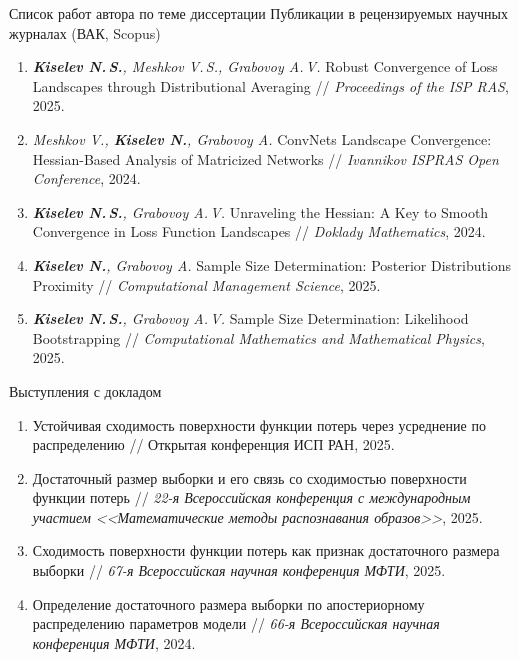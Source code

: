 \documentclass[aspectratio=169]{beamer}
\begin{document}
\begin{frame}{Список работ автора по теме диссертации}
    \scriptsize
    { Публикации в рецензируемых научных журналах (ВАК, Scopus)}\\
    \begin{enumerate}
        \item \textit{\textbf{Kiselev N.\,S.}, Meshkov V.\,S., Grabovoy A.\,V.} Robust Convergence of Loss Landscapes through Distributional Averaging // \textit{Proceedings of the ISP RAS}, 2025.
        \item \textit{Meshkov V., \textbf{Kiselev N.}, Grabovoy A.} ConvNets Landscape Convergence: Hessian-Based Analysis of Matricized Networks // \textit{Ivannikov ISPRAS Open Conference}, 2024.
        \item \textit{\textbf{Kiselev N.\,S.}, Grabovoy A.\,V.} Unraveling the Hessian: A Key to Smooth Convergence in Loss Function Landscapes // \textit{Doklady Mathematics}, 2024.
        \item \textit{\textbf{Kiselev N.}, Grabovoy A.} Sample Size Determination: Posterior Distributions Proximity // 
        \textit{Computational Management Science}, 2025.
        \item \textit{\textbf{Kiselev N.\,S.}, Grabovoy A.\,V.} Sample Size Determination: Likelihood Bootstrapping // \textit{Computational Mathematics and Mathematical Physics}, 2025.
    \end{enumerate}
    { Выступления с докладом}\\
    \begin{enumerate}
        \item Устойчивая сходимость поверхности функции потерь через усреднение по распределению // Открытая конференция ИСП РАН, 2025.
        \item Достаточный размер выборки и его связь со сходимостью поверхности функции потерь // \textit{22-я Всероссийская конференция с международным участием <<Математические методы распознавания образов>>}, 2025.
        \item Сходимость поверхности функции потерь как признак достаточного размера выборки // \textit{67-я Всероссийская научная конференция МФТИ}, 2025.
        \item Определение достаточного размера выборки по апостериорному распределению параметров модели // \textit{66-я Всероссийская научная конференция МФТИ}, 2024.
    \end{enumerate}
\end{frame}
\end{document}
